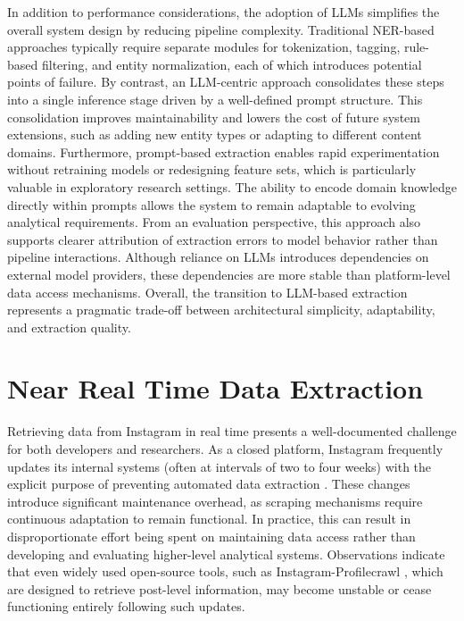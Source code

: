 \documentclass[a4paper,12pt]{report}
\begin{document}
In addition to performance considerations, the adoption of LLMs simplifies the overall system design by reducing pipeline complexity. Traditional NER-based approaches typically require separate modules for tokenization, tagging, rule-based filtering, and entity normalization, each of which introduces potential points of failure. By contrast, an LLM-centric approach consolidates these steps into a single inference stage driven by a well-defined prompt structure. This consolidation improves maintainability and lowers the cost of future system extensions, such as adding new entity types or adapting to different content domains. Furthermore, prompt-based extraction enables rapid experimentation without retraining models or redesigning feature sets, which is particularly valuable in exploratory research settings. The ability to encode domain knowledge directly within prompts allows the system to remain adaptable to evolving analytical requirements. From an evaluation perspective, this approach also supports clearer attribution of extraction errors to model behavior rather than pipeline interactions. Although reliance on LLMs introduces dependencies on external model providers, these dependencies are more stable than platform-level data access mechanisms. Overall, the transition to LLM-based extraction represents a pragmatic trade-off between architectural simplicity, adaptability, and extraction quality.

\section{Near Real Time Data Extraction}

Retrieving data from Instagram in real time presents a well-documented challenge for both developers and researchers. As a closed platform, Instagram frequently updates its internal systems (often at intervals of two to four weeks) with the explicit purpose of preventing automated data extraction \cite{scrapfly}. These changes introduce significant maintenance overhead, as scraping mechanisms require continuous adaptation to remain functional. In practice, this can result in disproportionate effort being spent on maintaining data access rather than developing and evaluating higher-level analytical systems. Observations indicate that even widely used open-source tools, such as Instagram-Profilecrawl \cite{instapy}, which are designed to retrieve post-level information, may become unstable or cease functioning entirely following such updates.
\end{document}

